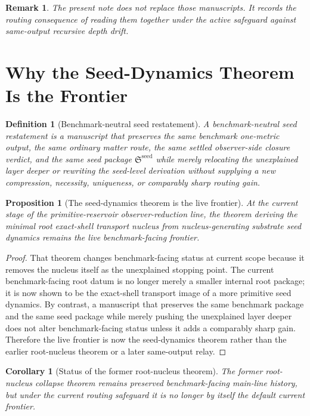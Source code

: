 \documentclass[11pt]{article}
\newcommand{\SeedPackage}{\mathfrak S^{\mathrm{seed}}}
\newtheorem{definition}{Definition}
\newtheorem{proposition}{Proposition}
\newtheorem{remark}{Remark}
\newtheorem{corollary}{Corollary}
\begin{document}
\begin{remark}
The present note does not replace those manuscripts. It records the routing consequence of reading them together under the active safeguard against same-output recursive depth drift.
\end{remark}

\section{Why the Seed-Dynamics Theorem Is the Frontier}

\begin{definition}[Benchmark-neutral seed restatement]
A \emph{benchmark-neutral seed restatement} is a manuscript that preserves the same benchmark one-metric output, the same ordinary matter route, the same settled observer-side closure verdict, and the same seed package \(\SeedPackage\) while merely relocating the unexplained layer deeper or rewriting the seed-level derivation without supplying a new compression, necessity, uniqueness, or comparably sharp routing gain.
\end{definition}

\begin{proposition}[The seed-dynamics theorem is the live frontier]
At the current stage of the primitive-reservoir observer-reduction line, the theorem deriving the minimal root exact-shell transport nucleus from nucleus-generating substrate seed dynamics remains the live benchmark-facing frontier.
\end{proposition}

\begin{proof}
That theorem changes benchmark-facing status at current scope because it removes the nucleus itself as the unexplained stopping point. The current benchmark-facing root datum is no longer merely a smaller internal root package; it is now shown to be the exact-shell transport image of a more primitive seed dynamics. By contrast, a manuscript that preserves the same benchmark package and the same seed package while merely pushing the unexplained layer deeper does not alter benchmark-facing status unless it adds a comparably sharp gain. Therefore the live frontier is now the seed-dynamics theorem rather than the earlier root-nucleus theorem or a later same-output relay.
\end{proof}

\begin{corollary}[Status of the former root-nucleus theorem]
The former root-nucleus collapse theorem remains preserved benchmark-facing main-line history, but under the current routing safeguard it is no longer by itself the default current frontier.
\end{corollary}
\end{document}
